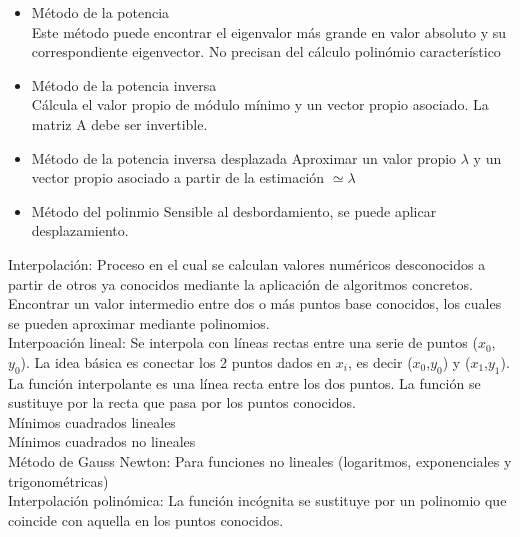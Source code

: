 \begin{itemize}
\item {M\'etodo de la potencia}\\
\noindent Este m\'etodo puede encontrar el eigenvalor m\'as grande en valor absoluto y su correspondiente eigenvector. No precisan del c\'alculo polin\'omio caracter\'istico

\item {M\'etodo de la potencia inversa}\\
\noindent C\'alcula el valor propio de m\'odulo m\'inimo y un vector propio asociado. La matriz A debe ser invertible.

\item {M\'etodo de la potencia inversa desplazada}
\noindent Aproximar un valor propio $\lambda$ y un vector propio asociado a partir de la estimaci\'on %
$\simeq \lambda$

\item {M\'etodo del polinmio}
\noindent Sensible al desbordamiento, se puede aplicar desplazamiento.
\end{itemize}


Interpolaci\'on: Proceso en el cual se calculan valores num\'ericos desconocidos a partir de otros ya conocidos mediante la aplicaci\'on de algoritmos concretos.\\
Encontrar un valor intermedio entre dos o m\'as puntos base conocidos, los cuales se pueden aproximar mediante polinomios.\\

Interpoaci\'on lineal: Se interpola con l\'ineas rectas entre una serie de puntos ($x_0$, $y_0$). La idea b\'asica es conectar los 2 puntos dados en $x_i$, es decir ($x_0$,$y_0$) y %
($x_1$,$y_1$). 
La funci\'on interpolante es una l\'inea recta entre los dos puntos. La funci\'on se sustituye por la recta que pasa por los puntos conocidos.\\

M\'inimos cuadrados lineales\\
M\'inimos cuadrados no lineales\\
M\'etodo de Gauss Newton: Para funciones no lineales (logaritmos, exponenciales y trigonom\'etricas)\\

Interpolaci\'on polin\'omica: La funci\'on inc\'ognita se sustituye por un polinomio que coincide con aquella en los puntos conocidos.\\

